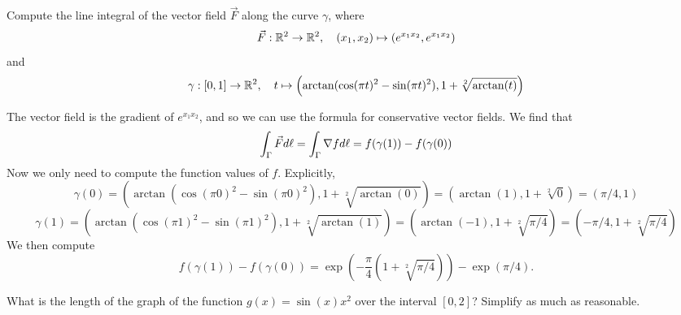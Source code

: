 \documentclass[11pt]{article}
\begin{document}
\begin{exercise}
    Compute the line integral of the vector field $\vec{F}$ along the curve $\gamma$, where 
    \[
        \vec F : \mathbb{R}^2 \to \mathbb{R}^2, \quad (x_1,x_2) \mapsto ( e^{ x_1x_2 }, e^{ x_1 x_2 } )
    \]
    and 
    \[
        \gamma : [0,1] \to \mathbb{R}^2, \quad t \mapsto \left( \arctan( \cos(\pi t)^2 - \sin(\pi t)^2 ), 1 + \sqrt[2]{\arctan(t)} \right)
    \]
\end{exercise}
\begin{solution}
    The vector field is the gradient of $e^{ x_1x_2 }$, and so we can use the formula for conservative vector fields.
    We find that
    \[
        \int_\Gamma \vec F d\ell = \int_\Gamma \nabla f d\ell = f(\gamma(1)) - f(\gamma(0))
    \]
    Now we only need to compute the function values of $f$. Explicitly,
    \[
        \gamma(0) = \left( \arctan( \cos(\pi 0)^2 - \sin(\pi 0)^2 ), 1 + \sqrt[2]{\arctan(0)} \right) = \left( \arctan( 1 ), 1 + \sqrt[2]{0} \right) = \left( \pi/4, 1 \right)
    \]
    \[
        \gamma(1) = \left( \arctan( \cos(\pi 1)^2 - \sin(\pi 1)^2 ), 1 + \sqrt[2]{\arctan(1)} \right) = \left( \arctan( -1 ), 1 + \sqrt[2]{\pi/4} \right) = \left( -\pi/4, 1 + \sqrt[2]{\pi/4} \right)
    \]
    We then compute
    \[
        f(\gamma(1)) - f(\gamma(0)) = \exp\left( -\frac \pi 4 ( 1 + \sqrt[2]{\pi/4} ) \right) - \exp\left( \pi/4 \right).
    \]
\end{solution}

\begin{exercise}
    What is the length of the graph of the function $g(x) = \sin(x) x^2$ over the interval $[0,2]$?
    Simplify as much as reasonable.
\end{exercise}
\begin{solution}
\end{solution}
\end{document}

